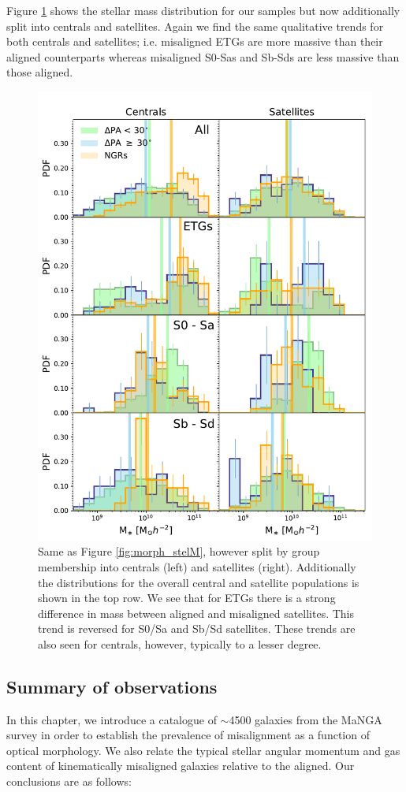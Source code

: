 Figure \ref{fig:group_morph_stelM} shows the stellar mass distribution for our samples but now additionally split into centrals and satellites. Again we find the same qualitative trends for both centrals and satellites; i.e. misaligned ETGs are more massive than their aligned counterparts whereas misaligned S0-Sas and Sb-Sds are less massive than those aligned.
\begin{figure}
    \centering
	\includegraphics[width=0.85\linewidth]{misalignment_MaNGA/delPA_stelM_morph_lim_nsa.pdf}
    \caption{Same as Figure \ref{fig:morph_stelM}, however split by group membership into centrals (left) and satellites (right). Additionally the distributions for the overall central and satellite populations is shown in the top row. We see that for ETGs there is a strong difference in mass between aligned and misaligned satellites. This trend is reversed for S0/Sa and Sb/Sd satellites. These trends are also seen for centrals, however, typically to a lesser degree.}
    \label{fig:group_morph_stelM}
\end{figure}

\subsection{Summary of observations} \label{sec:summary_manga}
In this chapter, we introduce a catalogue of $\sim$4500 galaxies from the MaNGA survey in order to establish the
prevalence of misalignment as a function of optical morphology. We also relate the typical stellar angular momentum and gas content of kinematically misaligned galaxies relative to the aligned. Our conclusions are as follows:

